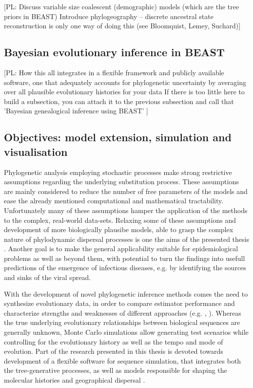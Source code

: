 [PL: Discuss variable size coalescent (demographic) models (which are the tree priors in BEAST)
Introduce phylogeography -- discrete ancestral state reconstruction is only one way of doing this (see Bloomquist, Lemey, Suchard)]


\subsection{Bayesian evolutionary inference in BEAST}


[PL: How this all integrates in a flexible framework and publicly available software, one that adequately accounts for phylogenetic uncertainty by averaging over all plausible evolutionary histories for your data
If there is too little here to build a subsection, you can attach it to the previous subsection and call that 'Bayesian genealogical inference using BEAST'
]



\subsection{Objectives: model extension, simulation and visualisation}

Phylogenetic analysis employing stochastic processes make strong restrictive assumptions regarding the underlying substitution process.
These assumptions are mainly considered to reduce the number of free parameters of the models and ease the already mentioned computational and mathematical tractability.
Unfortunately many of these assumptions hamper the application of the methods to the complex, real-world data-sets.
Relaxing some of these assumptions and development of more biologically plausibe models, able to grasp the complex nature of phylodynamic dispersal processes is one the aims of the presented thesis \citep{Bielejec2014a}.
Another goal is to make the general applicability suitable for epidemiological problems as well as beyond them, with potential to turn the findings into usefull predictions of the emergence of infectious diseases, e.g. by identifying the sources and sinks of the viral spread.

With the development of novel phylogenetic inference methods comes the need to synthesize evolutionary data, in order to compare estimator performance and characterize strengths and weaknesses of different approaches (e.g. \cite{Arenas2012}, \cite{Hoban2011}).
Whereas the true underlying evolutionary relationships between biological sequences are generally unknown, Monte Carlo simulations allow generating test scenarios while controlling for the evolutionary history as well as the tempo and mode of evolution. 
Part of the research presented in this thesis is devoted towards development of a flexible software for sequence simulation, that integrates both the tree-generative processes, as well as models responsible for shaping the molecular histories and geographical dispersal \citep{Bielejec2014a}.

